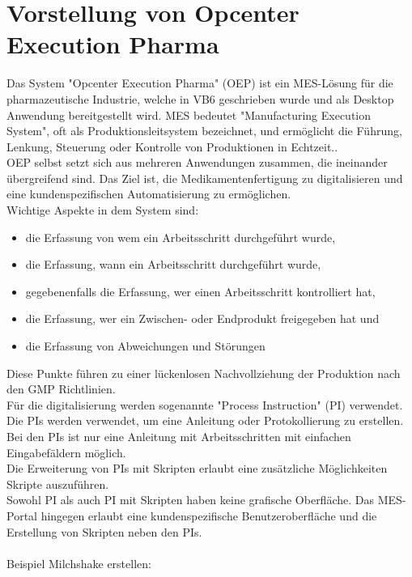 \documentclass[ngerman]{article}
\begin{document}
    \section{Vorstellung von Opcenter Execution Pharma}
    \label{VorstellungOEP}
    Das System "Opcenter Execution Pharma" (OEP) ist ein MES-Lösung für die pharmazeutische Industrie, welche in VB6 geschrieben wurde und als Desktop Anwendung bereitgestellt wird. MES bedeutet "Manufacturing Execution System", oft als Produktionsleitsystem bezeichnet, und ermöglicht die Führung, Lenkung, Steuerung oder Kontrolle von Produktionen in Echtzeit.\cite{OEP Main Page}.\\
    OEP selbst setzt sich aus mehreren Anwendungen zusammen, die ineinander übergreifend sind. Das Ziel ist, die Medikamentenfertigung zu digitalisieren und eine kundenspezifischen Automatisierung zu ermöglichen.\\
    Wichtige Aspekte in dem System sind:
    \begin{itemize}
        \item die Erfassung von wem ein Arbeitsschritt durchgeführt wurde,
        \item die Erfassung, wann ein Arbeitsschritt durchgeführt wurde,
        \item gegebenenfalls die Erfassung, wer einen Arbeitsschritt kontrolliert hat,
        \item die Erfassung, wer ein Zwischen- oder Endprodukt freigegeben hat und
        \item die Erfassung von Abweichungen und Störungen
    \end{itemize}
    Diese Punkte führen zu einer lückenlosen Nachvollziehung der Produktion nach den GMP Richtlinien.\\
    Für die digitalisierung werden sogenannte "Process Instruction" (PI) verwendet. Die PIs werden verwendet, um eine Anleitung oder Protokollierung zu erstellen.\\
    Bei den PIs ist nur eine Anleitung mit Arbeitsschritten mit einfachen Eingabefäldern möglich.\\
    Die Erweiterung von PIs mit Skripten erlaubt eine zusätzliche Möglichkeiten Skripte auszuführen.\\
    Sowohl PI als auch PI mit Skripten haben keine grafische Oberfläche. Das MES-Portal hingegen erlaubt eine kundenspezifische Benutzeroberfläche und die Erstellung von Skripten neben den PIs.\\\\
    Beispiel Milchshake erstellen:\\
\end{document}
